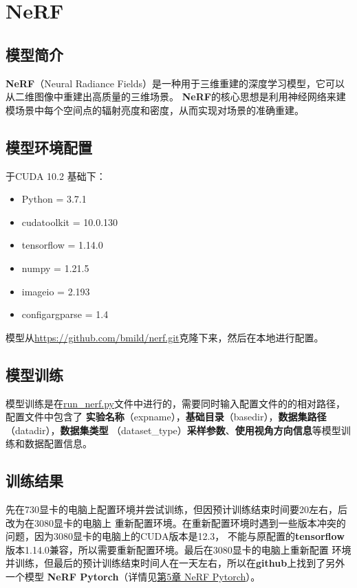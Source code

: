 \documentclass{nwputhesis}
\begin{document}
\section{NeRF}
\subsection{模型简介}
\textbf{NeRF}（Neural Radiance Fields）是一种用于三维重建的深度学习模型，它可以从二维图像中重建出高质量的三维场景。
\textbf{NeRF}的核心思想是利用神经网络来建模场景中每个空间点的辐射亮度和密度，从而实现对场景的准确重建。
\subsection{模型环境配置}
\noindent 于CUDA 10.2 基础下：
\begin{itemize}
    \item Python = 3.7.1
    \item cudatoolkit = 10.0.130
    \item tensorflow = 1.14.0
    \item numpy = 1.21.5
    \item imageio = 2.193
    \item configargparse = 1.4
\end{itemize}
模型从\underline{https://github.com/bmild/nerf.git}克隆下来，然后在本地进行配置。

\subsection{模型训练}
\indent 模型训练是在\underline{run\_nerf.py}文件中进行的，需要同时输入配置文件的的相对路径，配置文件中包含了
\textbf{实验名称}（expname），\textbf{基础目录}（basedir），\textbf{数据集路径}（datadir），\textbf{数据集类型}
（dataset\_type）\textbf{采样参数}、\textbf{使用视角方向信息}等模型训练和数据配置信息。

\subsection{训练结果}
先在730显卡的电脑上配置环境并尝试训练，但因预计训练结束时间要20左右，后改为在3080显卡的电脑上
重新配置环境。在重新配置环境时遇到一些版本冲突的问题，因为3080显卡的电脑上的CUDA版本是12.3，
不能与原配置的\textbf{tensorflow}版本1.14.0兼容，所以需要重新配置环境。最后在3080显卡的电脑上重新配置
环境并训练，但最后的预计训练结束时间人在一天左右，所以在\textbf{github}上找到了另外一个模型
\textbf{NeRF Pytorch}（详情见\hyperlink{section 5}{第5章 NeRF Pytorch}）。
\makespace
\end{document}
